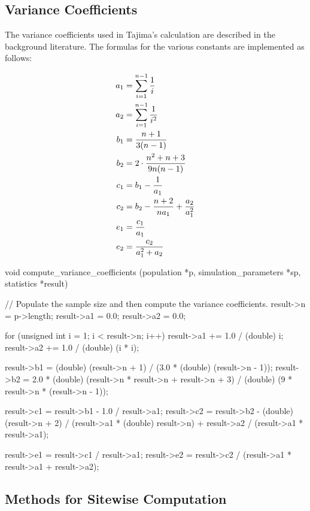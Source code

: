 \documentclass{article}
\begin{document}
    \subsection{Variance Coefficients}
      \label{sec:variance-coefficients}

      The variance coefficients used in Tajima's \D{} calculation are described
      in the background literature. The formulas for the various constants are
      implemented as follows:

      \begin{align*}
	a_1 & = \sum_{i=1}^{n-1} {1 \over i} \\ %
	a_2 & = \sum_{i=1}^{n-1} {1 \over i^2} \\ %
	b_1 & = {n + 1 \over 3(n - 1)} \\ %
	b_2 & = 2 \cdot {n^2 + n + 3 \over 9n(n - 1)} \\ %
	c_1 & = b_1 - {1 \over a_1} \\ %
	c_2 & = b_2 - {n + 2 \over na_1} + {a_2 \over a_1^2} \\ %
	e_1 & = {c_1 \over a_1} \\ %
	e_2 & = {c_2 \over a_1^2 + a_2}
      \end{align*}

\begin{ccode}
void compute_variance_coefficients (population *p, simulation_parameters *sp, statistics *result) {
  // Populate the sample size and then compute the variance coefficients.
  result->n 		= p->length;
  result->a1		= 0.0;
  result->a2		= 0.0;

  for (unsigned int i = 1; i < result->n; i++) {
    result->a1 += 1.0 / (double) i;
    result->a2 += 1.0 / (double) (i * i);
  }

  result->b1 = (double) (result->n + 1) / (3.0 * (double) (result->n - 1));
  result->b2 = 2.0 * (double) (result->n * result->n + result->n + 3) /
		     (double) (9 * result->n * (result->n - 1));

  result->c1 = result->b1 - 1.0 / result->a1;
  result->c2 = result->b2 -
	       (double) (result->n + 2) / (result->a1 * (double) result->n) +
	       result->a2 / (result->a1 * result->a1);

  result->e1 = result->c1 / result->a1;
  result->e2 = result->c2 / (result->a1 * result->a1 + result->a2);
}
\end{ccode}

    \subsection{Methods for Sitewise Computation}
      \label{sec:sitewise-computation}
\end{document}
